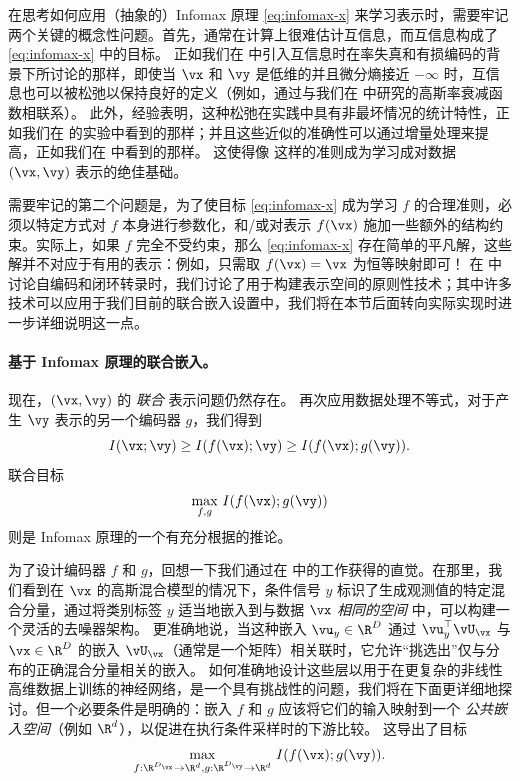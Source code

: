 \documentclass[../../book-main_zh.tex]{subfiles}
\begin{document}
在思考如何应用（抽象的）Infomax 原理 \eqref{eq:infomax-x} 来学习表示时，需要牢记两个关键的概念性问题。首先，通常在计算上很难估计互信息，而互信息构成了 \eqref{eq:infomax-x} 中的目标。
正如我们在  中引入互信息时在率失真和有损编码的背景下所讨论的那样，即使当 $\vx$ 和 $\vy$ 是低维的并且微分熵接近 $-\infty$ 时，互信息也可以被松弛以保持良好的定义（例如，通过与我们在  中研究的高斯率衰减函数相联系）。
此外，经验表明，这种松弛在实践中具有非最坏情况的统计特性，正如我们在  的实验中看到的那样；并且这些近似的准确性可以通过增量处理来提高，正如我们在  中看到的那样。
这使得像  这样的准则成为学习成对数据 $(\vx, \vy)$ 表示的绝佳基础。

需要牢记的第二个问题是，为了使目标 \eqref{eq:infomax-x} 成为学习 $f$ 的合理准则，必须以特定方式对 $f$ 本身进行参数化，和/或对表示 $f(\vx)$ 施加一些额外的结构约束。实际上，如果 $f$ 完全不受约束，那么 \eqref{eq:infomax-x} 存在简单的平凡解，这些解并不对应于有用的表示：例如，只需取 $f(\vx) = \vx$ 为恒等映射即可！
在  中讨论自编码和闭环转录时，我们讨论了用于构建表示空间的原则性技术；其中许多技术可以应用于我们目前的联合嵌入设置中，我们将在本节后面转向实际实现时进一步详细说明这一点。

\paragraph{基于 Infomax 原理的联合嵌入。}

现在，$(\vx, \vy)$ 的 \textit{联合} 表示问题仍然存在。
再次应用数据处理不等式，对于产生 $\vy$ 表示的另一个编码器 $g$，我们得到
\begin{equation*}
    I(\vx; \vy) \geq I(f(\vx); \vy) \geq I(f(\vx); g(\vy)).
\end{equation*}
联合目标
\begin{equation}\label{eq:infomax-x-y}
    \max_{f, g}\, I(f(\vx); g(\vy))
\end{equation}
则是 Infomax 原理的一个有充分根据的推论。

为了设计编码器 $f$ 和 $g$，回想一下我们通过在  中的工作获得的直觉。在那里，我们看到在 $\vx$ 的高斯混合模型的情况下，条件信号 $y$ 标识了生成观测值的特定混合分量，通过将类别标签 $y$ 适当地嵌入到与数据 $\vx$ \textit{相同的空间} 中，可以构建一个灵活的去噪器架构。
更准确地说，当这种嵌入 $\vu_y \in \R^D$ 通过 $\vu_y^\top \vU_{\vx}$ 与 $\vx \in \R^{D}$ 的嵌入 $\vU_{\vx}$（通常是一个矩阵）相关联时，它允许“挑选出”仅与分布的正确混合分量相关的嵌入。
如何准确地设计这些层以用于在更复杂的非线性高维数据上训练的神经网络，是一个具有挑战性的问题，我们将在下面更详细地探讨。但一个必要条件是明确的：嵌入 $f$ 和 $g$ 应该将它们的输入映射到一个 \textit{公共嵌入空间}（例如 $\R^d$），以促进在执行条件采样时的下游比较。
这导出了目标
\begin{equation}\label{eq:infomax-joint}
    \max_{f : \R^{D_{\vx}} \to \R^{d}, g: \R^{D_{\vy}} \to \R^d}\, 
    I(f(\vx); g(\vy)).
\end{equation}
\end{document}
